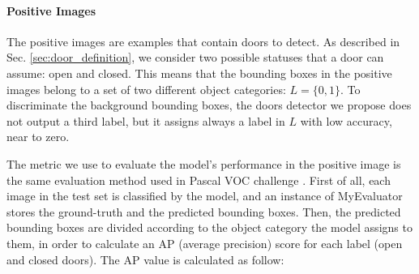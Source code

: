 \paragraph*{Positive Images} The positive images are examples that contain doors to detect. As described in Sec. \ref{sec:door_definition}, we consider two possible statuses that a door can assume: \textsf{open} and \textsf{closed}. This means that the bounding boxes in the positive images belong to a set of two different object categories: $L = \{0, 1\}$. To discriminate the background bounding boxes, the doors detector we propose does not output a third label, but it assigns always a label in $L$ with  low accuracy, near to zero. 

The metric we use to evaluate the model's performance in the positive image is the same evaluation method used in Pascal VOC challenge \cite{pascal}. First of all, each image in the test set is classified by the model, and an instance of \textsf{MyEvaluator} stores the  ground-truth and the predicted bounding boxes. Then, the predicted bounding boxes are divided according to the object category the model assigns to them, in order to calculate an AP (average precision) score for each label (\textsf{open} and \textsf{closed} doors). The AP value is calculated as follow:

